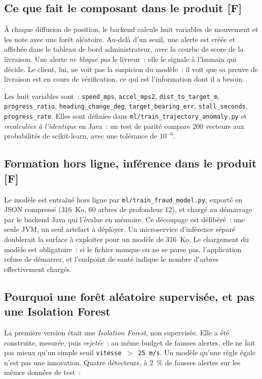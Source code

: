 \documentclass[11pt,a4paper]{article}
\begin{document}
\subsection{Ce que fait le composant dans le produit \textbf{[F]}}
\`A chaque diffusion de position, le backend calcule huit variables de mouvement et les note avec une for\^et al\'eatoire. Au-del\`a d'un seuil, une alerte est cr\'e\'ee et affich\'ee dans le tableau de bord administrateur, avec la courbe de score de la livraison. Une alerte \emph{ne bloque pas} le livreur~: elle le signale \`a l'humain qui d\'ecide. Le client, lui, ne voit pas la suspicion du mod\`ele~: il voit que sa preuve de livraison est en cours de v\'erification, ce qui est l'information dont il a besoin.

Les huit variables sont~: \texttt{speed\_mps}, \texttt{accel\_mps2}, \texttt{dist\_to\_target\_m}, \texttt{progress\_ratio}, \texttt{heading\_change\_deg}, \texttt{target\_bearing\_err}, \texttt{stall\_seconds}, \texttt{progress\_rate}. Elles sont d\'efinies dans \texttt{ml/train\_trajectory\_anomaly.py} et \emph{recalcul\'ees \`a l'identique} en Java~: un test de parit\'e compare 200 vecteurs aux probabilit\'es de scikit-learn, avec une tol\'erance de $10^{-6}$.

\subsection{Formation hors ligne, inf\'erence dans le produit \textbf{[F]}}
Le mod\`ele est entra\^in\'e hors ligne par \texttt{ml/train\_fraud\_model.py}, export\'e en JSON compress\'e (316~Ko, 60 arbres de profondeur 12), et charg\'e au d\'emarrage par le backend Java qui l'\'evalue en m\'emoire. Ce d\'ecoupage est d\'elib\'er\'e~: une seule JVM, un seul artefact \`a d\'eployer. Un microservice d'inf\'erence s\'epar\'e doublerait la surface \`a exploiter pour un mod\`ele de 316~Ko. Le chargement du mod\`ele est obligatoire~: si le fichier manque ou ne se parse pas, l'application refuse de d\'emarrer, et l'endpoint de sant\'e indique le nombre d'arbres effectivement charg\'es.

\subsection{Pourquoi une for\^et al\'eatoire supervis\'ee, et pas une Isolation Forest}
La premi\`ere version \'etait une \emph{Isolation Forest}, non supervis\'ee. Elle a \'et\'e construite, mesur\'ee, puis \emph{rejet\'ee}~: au m\^eme budget de fausses alertes, elle ne fait pas mieux qu'un simple seuil \texttt{vitesse $>$ 25~m/s}. Un mod\`ele qu'une r\`egle \'egale n'est pas une innovation. Quatre d\'etecteurs, \`a 2~\% de fausses alertes sur les m\^emes donn\'ees de test~:
\end{document}
